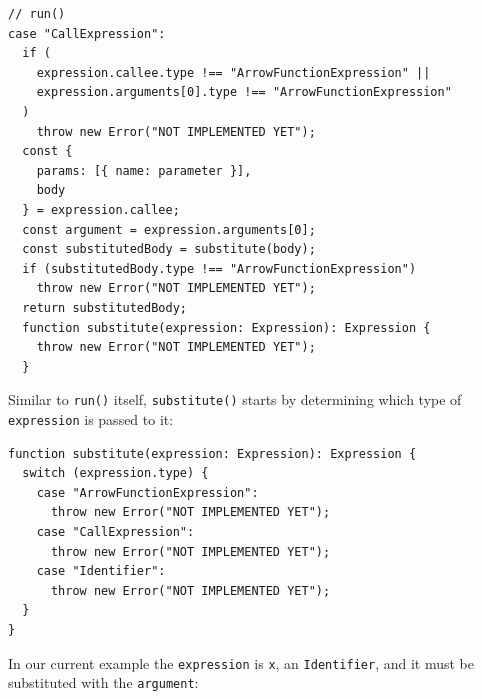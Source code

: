 \documentclass[12pt, oneside]{book}
\begin{document}
\begin{verbatim}
// run()
case "CallExpression":
  if (
    expression.callee.type !== "ArrowFunctionExpression" ||
    expression.arguments[0].type !== "ArrowFunctionExpression"
  )
    throw new Error("NOT IMPLEMENTED YET");
  const {
    params: [{ name: parameter }],
    body
  } = expression.callee;
  const argument = expression.arguments[0];
  const substitutedBody = substitute(body);
  if (substitutedBody.type !== "ArrowFunctionExpression")
    throw new Error("NOT IMPLEMENTED YET");
  return substitutedBody;
  function substitute(expression: Expression): Expression {
    throw new Error("NOT IMPLEMENTED YET");
  }
\end{verbatim}

Similar to \texttt{run()} itself, \texttt{substitute()} starts by determining which type of \texttt{expression} is passed to it:

\begin{verbatim}
function substitute(expression: Expression): Expression {
  switch (expression.type) {
    case "ArrowFunctionExpression":
      throw new Error("NOT IMPLEMENTED YET");
    case "CallExpression":
      throw new Error("NOT IMPLEMENTED YET");
    case "Identifier":
      throw new Error("NOT IMPLEMENTED YET");
  }
}
\end{verbatim}

In our current example the \texttt{expression} is \texttt{x}, an \texttt{Identifier}, and it must be substituted with the \texttt{argument}:
\end{document}
